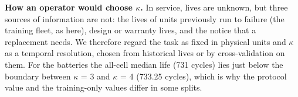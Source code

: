 \documentclass[11pt,a4paper]{article}
\begin{document}
\noindent \textbf{How an operator would choose $\kappa$.} In service, lives are unknown, but three sources of information are not: the lives of units previously run to failure (the training fleet, as here), design or warranty lives, and the notice that a replacement needs. We therefore regard the task as fixed in physical units and $\kappa$ as a temporal resolution, chosen from historical lives or by cross-validation on them. For the batteries the all-cell median life (731 cycles) lies just below the boundary between $\kappa$ = 3 and $\kappa$ = 4 (733.25 cycles), which is why the protocol value and the training-only values differ in some splits.
\end{document}
